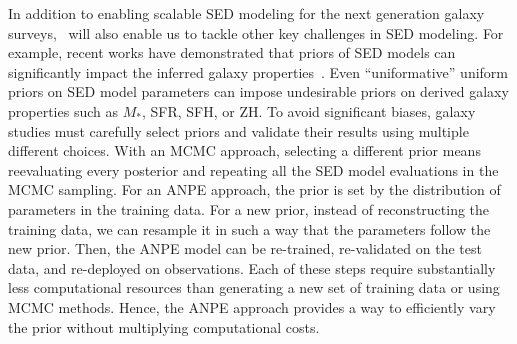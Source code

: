 In addition to enabling scalable SED modeling for the next generation galaxy
surveys, \sedflow~will also enable us to tackle other key challenges in SED
modeling. 
For example, recent works have demonstrated that priors of SED models can
significantly impact the inferred galaxy properties~\citep{carnall2018,
leja2019, hahn2022}. 
Even ``uniformative'' uniform priors on SED model parameters can impose
undesirable priors on derived galaxy properties such as $M_*$, SFR, SFH, or
ZH.
To avoid significant biases, galaxy studies must carefully select priors and
validate their results using multiple different choices. 
With an MCMC approach, selecting a different prior means reevaluating every
posterior and repeating all the SED model evaluations in the MCMC sampling.  
For an ANPE approach, the prior is set by the distribution of parameters in the
training data. 
For a new prior, instead of reconstructing the training data, we can resample
it in such a way that the parameters follow the new prior.
Then, the ANPE model can be re-trained, re-validated on the test data, and
re-deployed on observations.
Each of these steps require substantially less computational resources than
generating a new set of training data or using MCMC methods. 
Hence, the ANPE approach provides a way to efficiently vary the prior without
multiplying computational costs.
